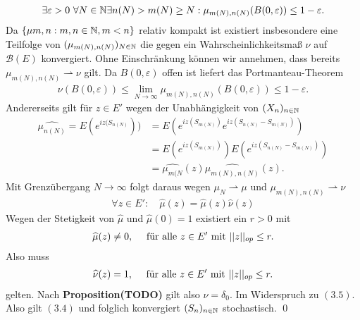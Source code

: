 \begin{proof*}
    \begin{align*}
        \exists \varepsilon > 0 \ \forall N \in \mathbb{N} \exists n(N) > m(N) \geq N: \mu_{m(N), n(N)}(B(0, \varepsilon)) \leq 1 - \varepsilon.
    \end{align*}
    Da $\{\mu{m,n}: m,n \in \mathbb{N}, m < n \}$ relativ kompakt ist existiert insbesondere eine Teilfolge von $(\mu_{m(N),n(N)})_{N \in \mathbb{N}}$ die gegen ein Wahrscheinlichkeitsmaß $\nu$ auf $\mathcal{B}(E)$ konvergiert.
    Ohne Einschränkung können wir annehmen, dass bereits $\mu_{m(N),n(N)} \rightharpoonup \nu$ gilt. Da $B(0, \varepsilon)$ offen ist liefert das Portmanteau-Theorem
    \begin{align}
        \nu(B(0, \varepsilon)) \leq \lim_{N \to \infty}\mu_{m(N),n(N)}(B(0,\varepsilon)) \leq 1 - \varepsilon. 
    \end{align}
    Andererseits gilt für $z \in E'$ wegen der Unabhängigkeit von $(X_n)_{n \in \mathbb{N}}$
    \begin{align*}
        \widehat{\mu_{n(N)}} = E(e^{iz(S_{n(N)}})) &= E(e^{iz(S_{m(N)})}e^{iz(S_{n(N)} - S_{m(N)})}) \\\
                                                   &= E(e^{iz(S_{m(N)})})E(e^{iz(S_{n(N)} - S_{m(N)})}) \\\
                                                   &= \widehat{\mu_{m(N}}(z)\widehat{\mu_{m(N),n(N)}}(z). 
    \end{align*}
    Mit Grenzübergang $N \to \infty$ folgt daraus wegen $\mu_N \rightharpoonup \mu$ und $\mu_{m(N),n(N)} \rightharpoonup \nu$
    \begin{align*}
        \forall z \in E': \quad \widehat{\mu}(z) = \widehat{\mu}(z) \widehat{\nu}(z)
    \end{align*}
    Wegen der Stetigkeit von $\widehat{\mu}$ und $\widehat{\mu}(0) = 1$ existiert ein $r>0$ mit 
    \begin{align*}
        \widehat{\mu}(z) \neq 0, \quad \text{ für alle } z \in E' \text{ mit } \lvert \lvert z \rvert \rvert_{op} \leq r. 
    \end{align*}
    Also muss 
    \begin{align*}
        \widehat{\nu}(z) = 1, \quad \text{ für alle } z \in E' \text{ mit } \lvert \lvert z \rvert \rvert_{op} \leq r. 
    \end{align*}
    gelten. Nach \textbf{Proposition(TODO)} gilt also $\nu = \delta_0$. Im Widerspruch zu $(3.5)$. Also gilt $(3.4)$ und folglich konvergiert $(S_n)_{n \in \mathbb{N}}$ stochastisch. 
    \qed
\end{proof*}

